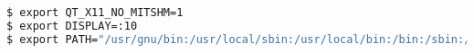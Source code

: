 
\begin{lstlisting}[language=bash, caption={Einstellen der Umgebungsvariablen für die chroot Umgebung},label={lst:chroot-env}]
$ export QT_X11_NO_MITSHM=1
$ export DISPLAY=:10
$ export PATH="/usr/gnu/bin:/usr/local/sbin:/usr/local/bin:/bin:/sbin:/usr/bin:."
\end{lstlisting}